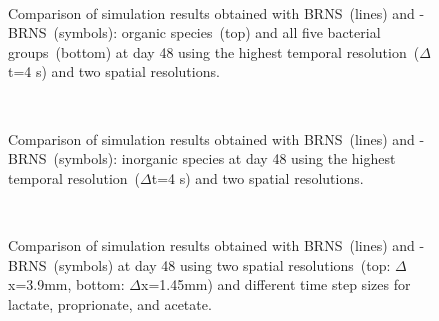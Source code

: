\begin{figure}[htb]
\centering
{}\\
\caption{
Comparison of simulation results obtained with BRNS~(lines) and
\GeoSys-BRNS~(symbols): organic species~(top) and all five bacterial
groups~(bottom) at day 48 using the highest temporal resolution~($\Delta$t=4 s)
and two spatial resolutions. 
}
\label{fig:columnresultsfine1}
\end{figure}

\begin{figure}[htb]
\centering
{}\\
\caption{
Comparison of simulation results obtained with BRNS~(lines) and
\GeoSys-BRNS~(symbols): inorganic species at day 48 using the highest temporal
resolution~($\Delta$t=4 s) and two spatial resolutions. 
}
\label{fig:columnresultsfine2}
\end{figure}

\begin{figure}[htb]
\centering
{}\\
\caption{
Comparison of simulation results obtained with BRNS~(lines) and
\GeoSys-BRNS~(symbols) at day 48 using two spatial resolutions~(top:
$\Delta$x=3.9mm, bottom: $\Delta$x=1.45mm) and different time step sizes for
lactate, proprionate, and acetate.
}
\label{fig:columnresults}
\end{figure}

\clearpage
